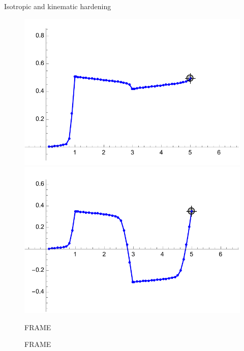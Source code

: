 \documentclass[aspectratio=169,xcolor=dvipsnames]{beamer}
\begin{document}
\begin{frame}{Isotropic and kinematic hardening}
\begin{figure}
\begin{minipage}{0.35\linewidth}
\begin{minipage}{\linewidth}
		\end{minipage}\hfill
			\begin{minipage}{0.5\linewidth}
			\centering
			\includegraphics[width=\linewidth]{plate_isotropic.pdf}
		\end{minipage}\hfill
		\begin{minipage}{0.5\linewidth}
			\centering
			\includegraphics[width=\linewidth]{plate_kinematic.pdf}
		\end{minipage}\hfill
		\end{minipage}
		\begin{minipage}{0.6\linewidth}
			\begin{minipage}{0.5\linewidth}
				\centering
FRAME
			\end{minipage}\hfill
			\begin{minipage}{0.5\linewidth}
				\centering
FRAME
			\end{minipage}\hfill

\end{minipage}
\end{figure}
\end{frame}
\end{document}

